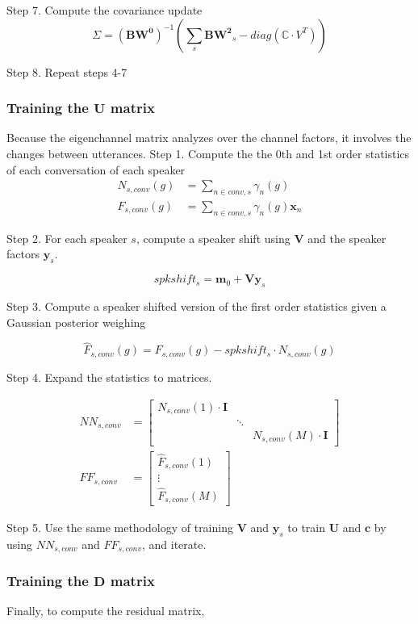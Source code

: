 Step 7. Compute the covariance update
$$\Sigma = (\bm{BW^0})^{-1} \left( \sum_s \bm{BW^2}_s - diag(\mathbb{C}\cdot V^T) \right)$$

Step 8. Repeat steps 4-7

\subsubsection{Training the $\bm{U}$ matrix}
Because the eigenchannel matrix analyzes over the channel factors, it involves the changes between utterances.
Step 1. Compute the the 0th and 1st order statistics of each conversation of each speaker
\begin{align*}
    N_{s,conv}(g) &= \sum_{n \in conv,s} \gamma_n (g) \\
    F_{s,conv}(g) &= \sum_{n \in conv,s} \gamma_n(g) \bm{x}_n
\end{align*}

Step 2. For each speaker $s$, compute a speaker shift using $\bm{V}$ and the speaker factors $\bm{y}_s$.

$$ spkshift_s = \bm{m}_0 + \bm{Vy}_s $$

Step 3. Compute a speaker shifted version of the first order statistics given a Gaussian posterior weighing

$$\hat{F}_{s,conv}(g) = F_{s,conv}(g) - spkshift_s \cdot N_{s,conv}(g) $$

Step 4. Expand the statistics to matrices.

\begin{align*}
    NN_{s,conv} &= \begin{bmatrix} N_{s,conv}(1) \cdot \bm{I} & & \\ & \ddots & \\ & & N_{s,conv}(M) \cdot \bm{I}  \end{bmatrix} \\
    FF_{s,conv} &= \begin{bmatrix} \hat{F}_{s,conv}(1) \\ \vdots \\ \hat{F}_{s,conv}(M) \end{bmatrix}
\end{align*}

Step 5. Use the same methodology of training $\bm{V}$ and $\bm{y}_s$ to train $\bm{U}$ and $\bm{c}$ by using $NN_{s,conv}$ and $FF_{s,conv}$, and iterate.

\subsubsection{Training the $\bm{D}$ matrix}
Finally, to compute the residual matrix,

